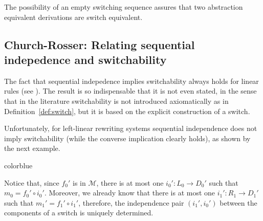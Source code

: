 \documentclass[a4paper,UKenglish,cleveref,pdftex,thm-restate,numberwithinsect,anonymous]{lipics}
\newcommand{\full}[1]{{color{blue}#1}}
\newcommand{\full}[1]{}
\begin{document}
\begin{remark}\label{rem:abst}
	The possibility of an empty switching sequence assures that two abstraction equivalent derivations are switch equivalent.
\end{remark}


\subsection{Church-Rosser: Relating sequential indepedence and switchability}\label{subsec:CR}


The fact that sequential indepedence implies switchability always
holds for linear rules (see ). The result is so
indispensable that it is not even stated, in the sense that
in the literature switchability is not introduced axiomatically as in
Definition~\ref{def:switch}, but it is based on the explicit
construction of a switch.

Unfortunately, for left-linear rewriting systems
sequential independence does not imply switchability (while the
converse implication clearly holds), as shown by the next example.

\full{
  \begin{remark}
    \label{rem:fact}
    Notice that, since $f_0'$ is in $\mathcal{M}$, there is
    at most one $i_0' \colon L_0\to D_0'$ such that
    $m_0=f_0' \circ i_0'$. Moreover, we already know that
    there is at most one $i_1' \colon R_1\to D_1'$ such that
    $m_1'=f_1' \circ i_1'$, therefore, the
    independence pair $(i_1',i_0')$ between the components of a switch is
    uniquely determined.
  \end{remark}
}
\end{document}
